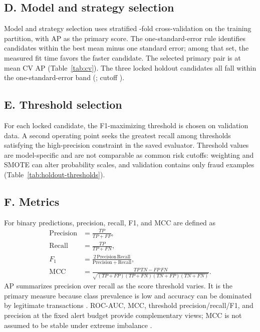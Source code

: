\documentclass[journal]{IEEEtran}
\begin{document}
\subsection{D. Model and strategy selection}
Model and strategy selection uses stratified \CVFoldCount-fold cross-validation on the training partition, with AP as the primary score. The one-standard-error rule identifies candidates within the best mean minus one standard error; among that set, the measured fit time favors the faster candidate. The selected primary pair is \PrimaryModel{} at mean CV AP \PrimaryCVAP{} (Table~\ref{tab:cv}). The three locked holdout candidates all fall within the one-standard-error band (\CVTopThreeWithinOneSE{}; cutoff \CVOneSECutoff{}).

\subsection{E. Threshold selection}
For each locked candidate, the F1-maximizing threshold is chosen on validation data. A second operating point seeks the greatest recall among thresholds satisfying the high-precision constraint in the saved evaluator. Threshold values are model-specific and are not comparable as common risk cutoffs: weighting and SMOTE can alter probability scales, and validation contains only \ValidationFraudCount{} fraud examples (Table~\ref{tab:holdout-thresholds}).

\subsection{F. Metrics}
For binary predictions, precision, recall, F1, and MCC are defined as
\begin{align}
\mathrm{Precision} &= \frac{TP}{TP+FP},\\
\mathrm{Recall} &= \frac{TP}{TP+FN},\\
F_1 &= \frac{2\,\mathrm{Precision}\,\mathrm{Recall}}{\mathrm{Precision}+\mathrm{Recall}},\\
\mathrm{MCC} &= \frac{TP\,TN-FP\,FN}{\sqrt{(TP+FP)(TP+FN)(TN+FP)(TN+FN)}}.
\end{align}
AP summarizes precision over recall as the score threshold varies. It is the primary measure because class prevalence is low and accuracy can be dominated by legitimate transactions \cite{saito2015}. ROC-AUC, MCC, threshold precision/recall/F1, and precision at the fixed alert budget provide complementary views; MCC is not assumed to be stable under extreme imbalance \cite{chicco2020}.
\end{document}
